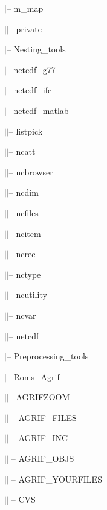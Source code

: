 $|$-- m\_map

$|$\hspace{0.5cm}$|$-- private

$|$-- Nesting\_tools

$|$-- netcdf\_g77

$|$-- netcdf\_ifc

$|$-- netcdf\_matlab

$|$\hspace{0.5cm}$|$-- listpick

$|$\hspace{0.5cm}$|$-- ncatt

$|$\hspace{0.5cm}$|$-- ncbrowser

$|$\hspace{0.5cm}$|$-- ncdim

$|$\hspace{0.5cm}$|$-- ncfiles

$|$\hspace{0.5cm}$|$-- ncitem

$|$\hspace{0.5cm}$|$-- ncrec

$|$\hspace{0.5cm}$|$-- nctype

$|$\hspace{0.5cm}$|$-- ncutility

$|$\hspace{0.5cm}$|$-- ncvar

$|$\hspace{0.5cm}$|$-- netcdf

$|$-- Preprocessing\_tools

$|$-- Roms\_Agrif

$|$\hspace{0.5cm}$|$-- AGRIFZOOM

$|$\hspace{0.5cm}$|$\hspace{0.5cm}$|$-- AGRIF\_FILES

$|$\hspace{0.5cm}$|$\hspace{0.5cm}$|$-- AGRIF\_INC

$|$\hspace{0.5cm}$|$\hspace{0.5cm}$|$-- AGRIF\_OBJS

$|$\hspace{0.5cm}$|$\hspace{0.5cm}$|$-- AGRIF\_YOURFILES

$|$\hspace{0.5cm}$|$\hspace{0.5cm}$|$-- CVS

